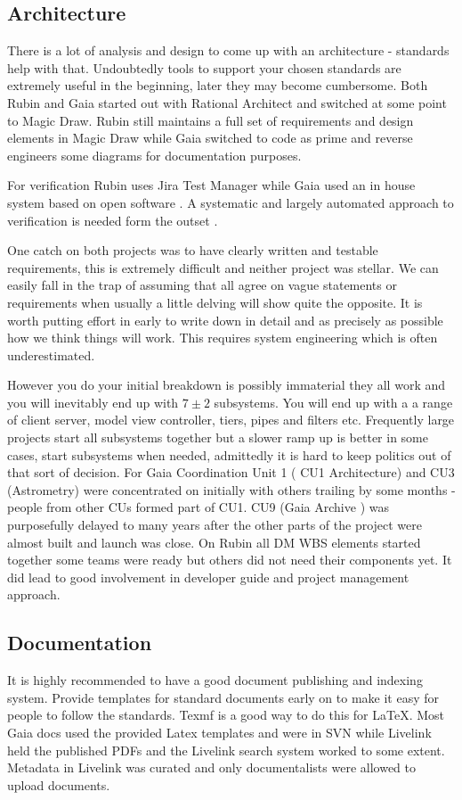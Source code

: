 \documentclass[11pt,twoside]{article}
\begin{document}
\subsection{Architecture}
There is a lot of analysis and design to come up with an architecture - standards help with that.
Undoubtedly tools to support your chosen standards are extremely useful in the beginning, later they may become cumbersome. Both Rubin and Gaia started out with Rational Architect and switched at some point to Magic Draw.
Rubin still maintains a full set of requirements and design elements in Magic Draw while Gaia switched to code as prime and reverse engineers some diagrams for documentation purposes.

For verification  Rubin uses  Jira Test Manager \citep{2018SPIE10705E..0US}  while  Gaia  used an in house system based on open software \citep{2012SPIE.8449E..0GC}.
A systematic and largely automated approach to verification is needed form the outset .

One catch on both projects was to have clearly written and testable requirements, this is extremely difficult and neither project was stellar.
We can easily fall in the trap of assuming that all agree on vague statements or requirements when usually a little delving will show quite the opposite.
It is worth putting effort in early to write down in detail and as precisely as possible how we think things will work.
This requires system engineering which is often underestimated.


However you do your initial breakdown is possibly immaterial they all work and you will inevitably end up with $7 \pm 2$ subsystems.
You will end up with a a range of client server, model view controller, tiers, pipes and filters etc.
Frequently large projects start all subsystems together but
a slower ramp up is better in some cases, start subsystems when needed, admittedly it is  hard to keep politics out of that sort of decision.
For Gaia Coordination Unit 1 ( CU1 Architecture) and CU3 (Astrometry) were concentrated on initially with others trailing by some months - people from other CUs formed part of CU1.
CU9 (Gaia Archive ) was purposefully delayed to many years after the other parts of the project were almost built and launch was close.
On Rubin all DM WBS elements started together
some  teams were ready but others did not need their components  yet.
It did lead to good involvement in developer guide and project management approach.


\subsection{Documentation}
It is highly recommended to have  a good document publishing and indexing system.
Provide templates for standard documents early on to make it easy for people to follow the standards. Texmf is a good way to do this for \LaTeX.
Most Gaia docs used the provided Latex templates and were in SVN while Livelink held the published PDFs and the Livelink search system worked to some extent.
Metadata in Livelink was curated and only documentalists  were allowed to upload documents.
\end{document}

